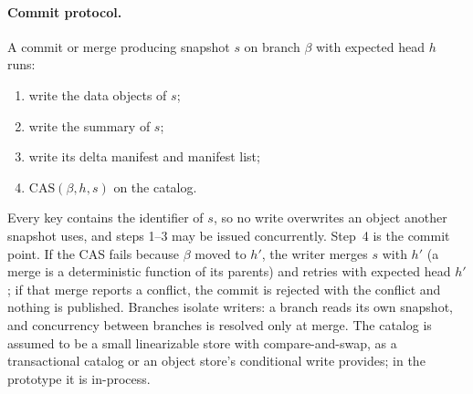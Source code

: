 \documentclass[sigconf, nonacm]{acmart}
\begin{document}
\paragraph{Commit protocol.} A commit or merge producing snapshot $s$ on branch $\beta$ with expected head $h$ runs:
\begin{enumerate}[leftmargin=12pt, itemsep=0pt, topsep=1pt]
    \item write the data objects of $s$;
    \item write the summary of $s$;
    \item write its delta manifest and manifest list;
    \item $\text{CAS}(\beta, h, s)$ on the catalog.
\end{enumerate}
Every key contains the identifier of $s$, so no write overwrites an object another snapshot uses, and steps 1--3 may be issued concurrently. Step~4 is the commit point. If the CAS fails because $\beta$ moved to $h'$, the writer merges $s$ with $h'$ (a merge is a deterministic function of its parents) and retries with expected head $h'$; if that merge reports a conflict, the commit is rejected with the conflict and nothing is published. Branches isolate writers: a branch reads its own snapshot, and concurrency between branches is resolved only at merge. The catalog is assumed to be a small linearizable store with compare-and-swap, as a transactional catalog or an object store's conditional write provides; in the prototype it is in-process.
\end{document}
